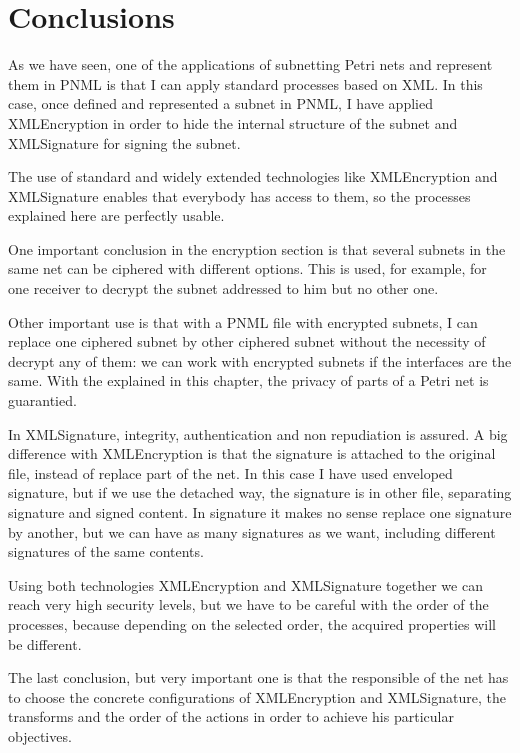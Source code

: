 \section{Conclusions}

As we have seen, one of the applications of subnetting Petri nets and represent
them in PNML is that I can apply standard processes based on XML. In this
case, once defined and represented a subnet in PNML, I have applied XMLEncryption in order to hide the internal structure of the subnet and XMLSignature for
signing the subnet. 

The use of standard and widely extended technologies like XMLEncryption and
XMLSignature enables that everybody has access to them, so the processes
explained here are perfectly usable. 

One important conclusion in the encryption section is that several subnets in the same net can be ciphered with different
options. This is used, for example, for  one receiver
to decrypt the subnet addressed to him but no other one.

Other important
use is that with a PNML file with encrypted subnets, I can replace one ciphered subnet by other ciphered subnet without the necessity of decrypt any of them: we can work with encrypted subnets if the interfaces are the same. 
With the explained in this chapter, the privacy of parts of a Petri net is guarantied.


In XMLSignature,   integrity, authentication and non repudiation is assured.
A big difference with XMLEncryption is that the signature is attached to
the original file, instead of replace part of the net. In this case I have used enveloped signature, but if we use the
detached way, the signature is in other file, separating signature and signed content. In signature it makes no sense replace one signature by another,
but we can have as many signatures as we want, including different signatures of the same contents.

  
Using both technologies XMLEncryption and XMLSignature together we can reach
very high security levels, but we have to be careful with the order of the processes, because depending on the selected order, the acquired properties will be different.

The last conclusion, but very important one is that the responsible of the net has to choose the concrete configurations of XMLEncryption and XMLSignature, the transforms and the order of the actions in order to achieve his particular objectives. 
